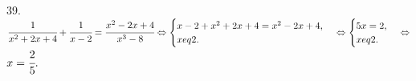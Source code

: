 39. $\cfrac{1}{x^2+2x+4}+\cfrac{1}{x-2}=\cfrac{x^2-2x+4}{x^3-8}\Leftrightarrow \begin{cases}x-2+x^2+2x+4=x^2-2x+4,\\ x
eq2.\end{cases}
\Leftrightarrow \begin{cases}5x=2,\\ x
eq2.\end{cases}\Leftrightarrow$\\$ x=\cfrac{2}{5}.$\\

